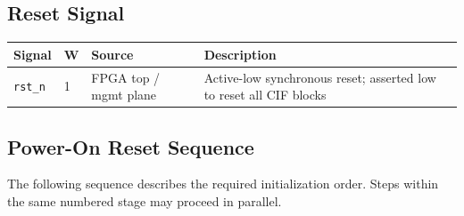 \documentclass[11pt,a4paper]{article}
\begin{document}
\subsection{Reset Signal}

\begin{tabularx}{\textwidth}{L{2.5cm} C{0.8cm} L{3cm} X}
\toprule
\textbf{Signal} & \textbf{W} & \textbf{Source} & \textbf{Description} \\
\midrule
\texttt{rst\_n} & 1 & FPGA top / mgmt plane & Active-low synchronous reset; asserted low to reset all CIF blocks \\
\bottomrule
\end{tabularx}

\subsection{Power-On Reset Sequence}

The following sequence describes the required initialization order.
Steps within the same numbered stage may proceed in parallel.
\end{document}
